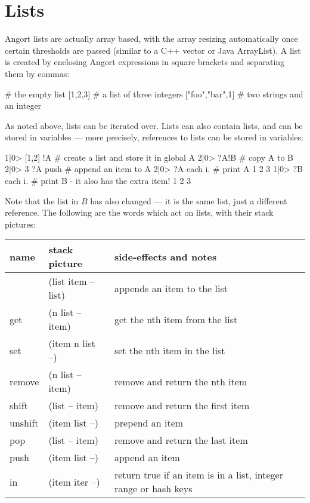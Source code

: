 \section{Lists}
\label{lists}
\indw{[|textbf}\indw{]|textbf}
Angort lists are actually array based, with the array resizing automatically
once certain thresholds are passed (similar to a C++ vector or Java ArrayList).
A list is created by enclosing Angort expressions in square
brackets and separating them by commas:
\begin{v}
[]              # the empty list
[1,2,3]         # a list of three integers
["foo","bar",1] # two strings and an integer
\end{v}
As noted above, lists can be iterated over. Lists can also contain lists,
and can be stored in variables ---  more precisely, references to lists can
be stored in variables:
\begin{v}
1|0> [1,2] !A       # create a list and store it in global A
2|0> ?A!B           # copy A to B
2|0> 3 ?A push      # append an item to A
2|0> ?A each {i.}   # print A
1
2
3
1|0> ?B each {i.}   # print B - it also has the extra item!
1
2
3
\end{v}
Note that the list in $B$ has also changed --- it is the same list,
just a different reference.
The following are the words which act on lists, with their stack pictures:
\indw{[|textbf}\indw{]|textbf}
\begin{center}
\begin{tabular}{|l|l|p{4in}|}\hline
\textbf{name} & \textbf{stack picture} & \textbf{side-effects and notes}\\ \hline
[    & (-- list)    & creates a new list\\
,    & (list item -- list) & appends an item to the list\\
]    & (list item -- list) & appends an item to the list\\
get & (n list -- item) & get the nth item from the list\\
set & (item n list --) & set the nth item in the list\\
remove & (n list -- item) & remove and return the nth item\\
shift & (list -- item) & remove and return the first item\\
unshift & (item list --) & prepend an item\\
pop & (list -- item) & remove and return the last item\\
push & (item list --) & append an item\\
in & (item iter --) & return true if an item is in a list, integer range or hash keys\\
\hline
\end{tabular}
\end{center}
